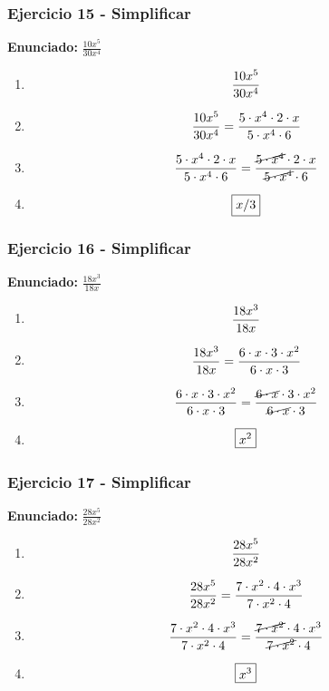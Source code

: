 \documentclass[11pt,a4paper]{article}
\newcommand{\fitmath}[1]{%
\[
\setbox0=\hbox{$\displaystyle #1$}%
\ifdim\wd0>\linewidth
\resizebox{\linewidth}{!}{$\displaystyle #1$}%
\else
#1%
\fi
\]
}
\begin{document}
\vspace{0.12cm}
\subsubsection*{Ejercicio 15 - Simplificar}
\textbf{Enunciado:} $ \frac{10 x^{5}}{30 x^{4}} $\par
\begin{enumerate}[leftmargin=2em]
\item \fitmath{\frac{10 x^{5}}{30 x^{4}}}
\item \fitmath{\frac{10 x^{5}}{30 x^{4}}=\frac{5\cdot x^{4}\cdot 2\cdot x}{5\cdot x^{4}\cdot 6}}
\item \fitmath{\frac{5\cdot x^{4}\cdot 2\cdot x}{5\cdot x^{4}\cdot 6}=\frac{\cancel{5\cdot x^{4}}\cdot 2\cdot x}{\cancel{5\cdot x^{4}}\cdot 6}}
\item \fitmath{\boxed{x / 3}}
\end{enumerate}

\vspace{0.12cm}
\subsubsection*{Ejercicio 16 - Simplificar}
\textbf{Enunciado:} $ \frac{18 x^{3}}{18 x} $\par
\begin{enumerate}[leftmargin=2em]
\item \fitmath{\frac{18 x^{3}}{18 x}}
\item \fitmath{\frac{18 x^{3}}{18 x}=\frac{6\cdot x\cdot 3\cdot x^{2}}{6\cdot x\cdot 3}}
\item \fitmath{\frac{6\cdot x\cdot 3\cdot x^{2}}{6\cdot x\cdot 3}=\frac{\cancel{6\cdot x}\cdot 3\cdot x^{2}}{\cancel{6\cdot x}\cdot 3}}
\item \fitmath{\boxed{x^{2}}}
\end{enumerate}

\vspace{0.12cm}
\subsubsection*{Ejercicio 17 - Simplificar}
\textbf{Enunciado:} $ \frac{28 x^{5}}{28 x^{2}} $\par
\begin{enumerate}[leftmargin=2em]
\item \fitmath{\frac{28 x^{5}}{28 x^{2}}}
\item \fitmath{\frac{28 x^{5}}{28 x^{2}}=\frac{7\cdot x^{2}\cdot 4\cdot x^{3}}{7\cdot x^{2}\cdot 4}}
\item \fitmath{\frac{7\cdot x^{2}\cdot 4\cdot x^{3}}{7\cdot x^{2}\cdot 4}=\frac{\cancel{7\cdot x^{2}}\cdot 4\cdot x^{3}}{\cancel{7\cdot x^{2}}\cdot 4}}
\item \fitmath{\boxed{x^{3}}}
\end{enumerate}
\end{document}
